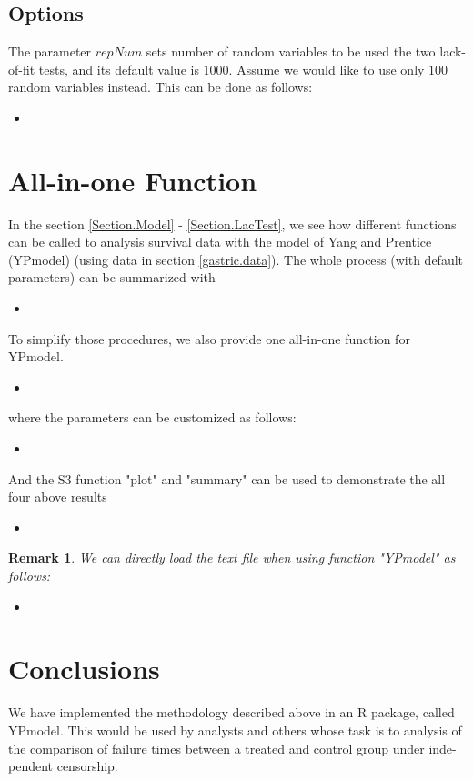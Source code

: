 \documentclass[12pt]{article}
\newcommand{\insertcode}[2]{\begin{itemize}\item[]\end{itemize}} %
\newtheorem{remark}{Remark}
\begin{document}
\subsection{Options}
The parameter $repNum$ sets number of random variables to be used the two lack-of-fit tests, and its default value is $1000$. Assume we would like to use only $100$ random variables instead. This can be done as follows:
\insertcode{"Scripts/code20.pl"}{Loading YPmodel package and performing estimating process.}

\section{All-in-one Function}\label{Section.All}

In the section \ref{Section.Model} - \ref{Section.LacTest}, we see how different functions can be called to analysis survival data with the model of Yang and Prentice (YPmodel) (using data in section \ref{gastric.data}). The whole process (with default parameters) can be summarized with
\insertcode{"Scripts/code25.pl"}{Summary of functions.}

To simplify those procedures, we also provide one all-in-one function for YPmodel.
\insertcode{"Scripts/code26.pl"}{All-in-one Function.}
where the parameters can be customized as follows:
\insertcode{"Scripts/code26 - 2.pl"}{All-in-one Function with customized parameters.}

And the S3 function "plot" and "summary" can be used to demonstrate the all four above results
\insertcode{"Scripts/code26 - 1.pl"}{Demonstrating the overall results.}

\begin{remark}
We can directly load the text file when using function "YPmodel" as follows:
\insertcode{"Scripts/code27.pl"}{Performing YPmodel with text files.}
\end{remark}

\section{Conclusions}\label{Section.Conclusions}
We have implemented the methodology described above in an R package, called YPmodel.
This would be used by analysts and others whose task is to analysis of the
comparison of failure times between a treated and control group under inde-
pendent censorship.
\end{document}
